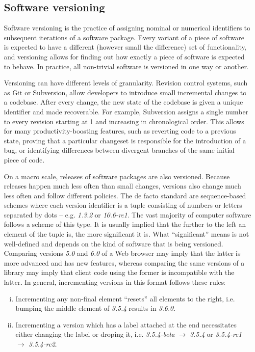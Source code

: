 \documentclass{l4proj}
\begin{document}
\subsection{Software versioning}
Software versioning is the practice of assigning nominal or numerical
identifiers to subsequent iterations of a software package. Every
variant of a piece of software is expected to have a different
(however small the difference) set of functionality, and versioning
allows for finding out how exactly a piece of software is expected to
behave. In practice, all non-trivial software is versioned in one way
or another.

Versioning can have different levels of granularity. Revision control
systems, such as Git or Subversion, allow developers to introduce
small incremental changes to a codebase. After every change, the new
state of the codebase is given a unique identifier and made
recoverable. For example, Subversion assigns a single number to every
revision starting at 1 and increasing in chronological order. This
allows for many productivity-boosting features, such as reverting code
to a previous state, proving that a particular changeset is
responsible for the introduction of a bug, or identifying differences
between divergent branches of the same initial piece of code.

On a macro scale, releases of software packages are also versioned.
Because releases happen much less often than small changes, versions
also change much less often and follow different policies. The de
facto standard are sequence-based schemes where each version
identifier is a tuple consisting of numbers or letters separated by
dots -- e.g. \textit{1.3.2} or \textit{10.6-rc1}. The vast majority of
computer software follows a scheme of this type. It is usually implied
that the further to the left an element of the tuple is, the more
significant it is. What ``significant'' means is not well-defined and
depends on the kind of software that is being versioned. Comparing
versions \textit{5.0} and \textit{6.0} of a Web browser may imply that
the latter is more advanced and has new features, whereas comparing
the same versions of a library may imply that client code using the
former is incompatible with the latter. In general, incrementing
versions in this format follows these rules:
\begin{enumerate}[(i)]
\item Incrementing any non-final element ``resets'' all elements to
the right, i.e. bumping the middle element of \textit{3.5.4} results
in \textit{3.6.0}.
\item Incrementing a version which has a label attached at the end
necessitates either changing the label or droping it, i.e.
\textit{3.5.4-beta} $\rightarrow$ \textit{3.5.4} or \textit{3.5.4-rc1}
$\rightarrow $ \textit{3.5.4-rc2}.
\end{enumerate}
\end{document}
